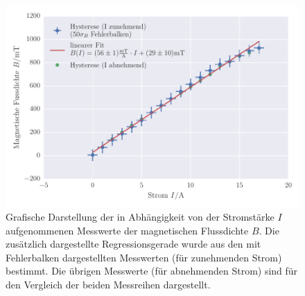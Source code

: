\FloatBarrier
\begin{figure}[!h]
\centering
\includegraphics[scale=1]{../Grafiken/Hysterese_Messung_I_zunehmend.pdf}
\caption{Grafische Darstellung der in Abhängigkeit von der Stromstärke $I$
         aufgenommenen Messwerte der magnetischen Flussdichte $B$.
         Die zusätzlich dargestellte Regressionsgerade wurde aus den mit
         Fehlerbalken dargestellten Messwerten (für zunehmenden Strom) bestimmt.
         Die übrigen Messwerte (für abnehmenden Strom) sind für den Vergleich
         der beiden Messreihen dargestellt.
         \label{fig:hysterese_messung_i_zunehmend}}
\end{figure}
\FloatBarrier
